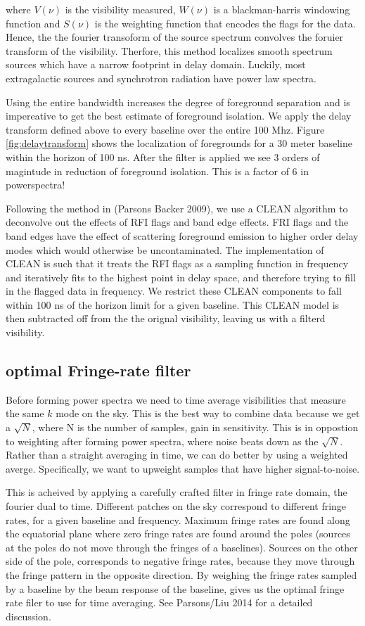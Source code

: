 \documentclass[twocolumn,numberedappendix]{emulateapj}
\begin{document}
where $V(\nu)$ is the visibility measured, $W(\nu)$ is a blackman-harris
windowing function and $S(\nu)$ is the weighting function that encodes the flags
for the data. Hence, the the fourier transoform of the source spectrum convolves
the foruier transform of the visibility. Therfore, this method localizes smooth
spectrum sources which have a narrow footprint in delay domain. Luckily, most
extragalactic sources and synchrotron radiation have power law spectra.

Using the entire bandwidth increases the degree of foreground separation and is
impereative to get the best estimate of foreground isolation. We apply the delay
transform defined above to every baseline over the entire 100 Mhz. Figure
\ref{fig:delaytransform} shows the localization of foregrounds for a 30 meter
baseline within the horizon of 100 ns. After the filter is applied we see 3
orders of magintude in reduction of foreground isolation.  This is a factor of 6
in powerspectra! 

Following the method in (Parsons Backer 2009), we use a CLEAN
algorithm to deconvolve out the effects of RFI flags and band edge effects. FRI
flags and the band edges have the effect of scattering foreground emission to
higher order delay modes which would otherwise be uncontaminated. The
implementation of CLEAN is such that it treats the RFI flags as a sampling
function in frequency and iteratively fits to the highest point in delay space,
and therefore trying to fill in the flagged data in frequency. We restrict these
CLEAN components to fall within 100 ns of the horizon limit for a given
baseline.  This CLEAN model is then subtracted off from the the orignal
visibility, leaving us with a filterd visibility.




\subsection{optimal Fringe-rate filter}
Before forming power spectra we need to time average visibilities that measure
the same $k$ mode on the sky. This is the best way to combine data because we
get a $\sqrt{N}$, where N is the number of samples, gain in sensitivity. This is
in oppostion to weighting after forming power spectra, where noise beats down as
the $\sqrt{N}$. Rather than a straight averaging in time, we can do better by
using a weighted averge. Specifically, we want to upweight samples that have
higher signal-to-noise. 

This is acheived by applying a carefully crafted filter in fringe rate domain,
the fourier dual to time. Different patches on the sky correspond to different
fringe rates, for a given baseline and frequency. Maximum fringe rates are found
along the equatorial plane where zero fringe rates are found around the poles
(sources at the poles do not move through the fringes of a baselines). Sources
on the other side of the pole, corresponds to negative fringe rates, because
they move through the fringe pattern in the opposite direction. By weighing the
fringe rates sampled by a baseline by the beam response of the baseline, gives
us the optimal fringe rate filer to use for time averaging. See Parsons/Liu 2014
for a detailed discussion.
\end{document}

